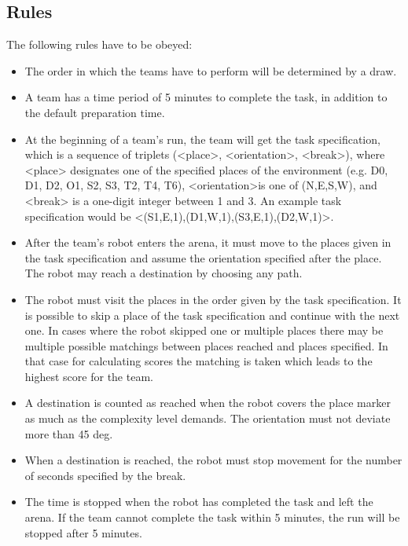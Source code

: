 \subsection{Rules}
The following rules have to be obeyed:

\begin{itemize}
\item The order in which the teams have to perform will be determined by a draw.
\item A team has a time period of 5 minutes to complete the task, in addition to the default preparation time.
\item At the beginning of a team’s run, the team will get the task specification, which is a sequence of triplets (\textless place\textgreater, \textless orientation\textgreater, \textless break\textgreater), where <place> designates one of the specified places of the environment (e.g. D0, D1, D2, O1, S2, S3, T2, T4, T6), \textless orientation\textgreater is one of (N,E,S,W), and <break> is a one-digit integer between 1 and 3. An example task specification would be \textless (S1,E,1),(D1,W,1),(S3,E,1),(D2,W,1)\textgreater .
\item After the team’s robot enters the arena, it must move to the places given in the task specification and assume the orientation specified after the place. The robot may reach a destination by choosing any path.
\item The robot must visit the places in the order given by the task specification. It is possible to skip a place of the task specification and continue with the next one. In cases where the robot skipped one or multiple places there may be multiple possible matchings between places reached and places specified. In that case for calculating scores the matching is taken which leads to the highest score for the team.
\item A destination is counted as reached when the robot covers the place marker as much as the complexity level demands. The orientation must not deviate more than 45 deg.
\item When a destination is reached, the robot must stop movement for the number of seconds specified by the break.
\item The time is stopped when the robot has completed the task and left the arena. If the team cannot complete the task within 5 minutes, the run will be stopped after 5 minutes.
\end{itemize}
%
%
%
